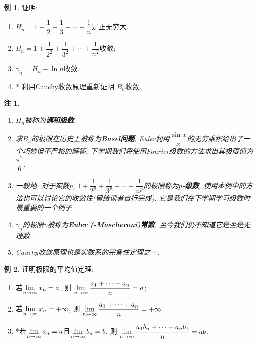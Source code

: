 \documentclass{ctexart}
\newtheorem*{rmk}{注}
\theoremstyle{definition}
\newtheorem{ex}{例}
\DeclareMathOperator{\anlim}{\lim\limits_{\mathnormal{n}\to\infty}}
\renewcommand{\frac}{\dfrac}
\begin{document}
\begin{ex}
证明: 
\begin{enumerate}

\item $H_n=1+\frac{1}{2}+\frac{1}{3}+\cdots+\frac{1}{n}$是正无穷大. 

\item $B_n=1+\frac{1}{2^2}+\frac{1}{3^2}+\cdots+\frac{1}{n^2}$收敛; 

\item $\gamma_n=H_n-\ln n$收敛.

\item* 利用Cauchy收敛原理重新证明 $B_n$收敛.
\end{enumerate}
\end{ex}

\begin{rmk}
\,\begin{enumerate}
\item $H_n$被称为\textbf{调和级数}. 

\item  求$B_n$的极限在历史上被称为\textbf{Basel问题}, Euler利用$\frac{\sin x}{x}$的无穷乘积给出了一个巧妙但不严格的解答, 下学期我们将使用Fourier级数的方法求出其极限值为$\frac{\pi^2}{6}$.  

\item  一般地, 对于实数$p$, $1+\frac{1}{2^p}+\frac{1}{3^p}+\cdots+\frac{1}{n^p}$的极限称为\textbf{$p$-级数}, 使用本例中的方法也可以讨论它的收敛性(留给读者自行完成). 它是我们在下学期学习级数时最重要的一个例子.  

\item $\gamma_n$的极限$\gamma$被称为\textbf{Euler (-Mascheroni)常数}, 至今我们仍不知道它是否是无理数.

\item Cauchy收敛原理也是实数系的完备性定理之一.
\end{enumerate}
\end{rmk}

\begin{ex}
证明极限的平均值定理: 
\begin{enumerate}

\item 若$\anlim x_n=a$, 则 $\anlim\frac{a_1+\cdots+a_n}{n}=a$; 

\item 若$\anlim x_n=+\infty$, 则 $\anlim\frac{a_1+\cdots+a_n}{n}=+\infty$,

\item *若$\anlim a_n=a$且$\anlim b_n=b$, 则 $\anlim\frac{a_1b_n+\cdots+a_nb_1}{n}=ab$.
\end{enumerate}
\end{ex}
\end{document}
